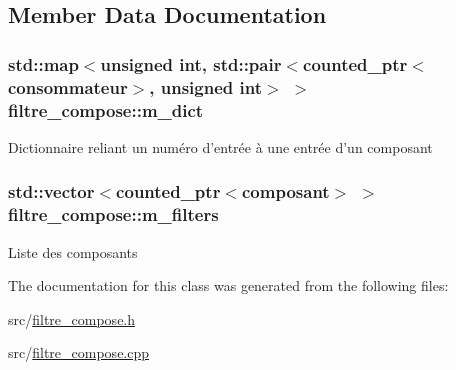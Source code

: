 \subsection{Member Data Documentation}
\hypertarget{classfiltre__compose_ab0a900380de582219751e3451104cfa7}{
\subsubsection[{m\-\_\-dict}]{\setlength{\rightskip}{0pt plus 5cm}std\-::map$<$unsigned int, std\-::pair$<${\bf counted\-\_\-ptr}$<${\bf consommateur}$>$, unsigned int$>$ $>$ filtre\-\_\-compose\-::m\-\_\-dict\hspace{0.3cm}{\ttfamily [private]}}}\label{classfiltre__compose_ab0a900380de582219751e3451104cfa7}
Dictionnaire reliant un numéro d'entrée à une entrée d'un composant \hypertarget{classfiltre__compose_ae857e33daea1b9afa3689322241dac33}{
\subsubsection[{m\-\_\-filters}]{\setlength{\rightskip}{0pt plus 5cm}std\-::vector$<${\bf counted\-\_\-ptr}$<${\bf composant}$>$ $>$ filtre\-\_\-compose\-::m\-\_\-filters\hspace{0.3cm}{\ttfamily [private]}}}\label{classfiltre__compose_ae857e33daea1b9afa3689322241dac33}
Liste des composants 

The documentation for this class was generated from the following files\-:\begin{DoxyCompactItemize}
\item 
src/\hyperlink{filtre__compose_8h}{filtre\-\_\-compose.\-h}\item 
src/\hyperlink{filtre__compose_8cpp}{filtre\-\_\-compose.\-cpp}\end{DoxyCompactItemize}
